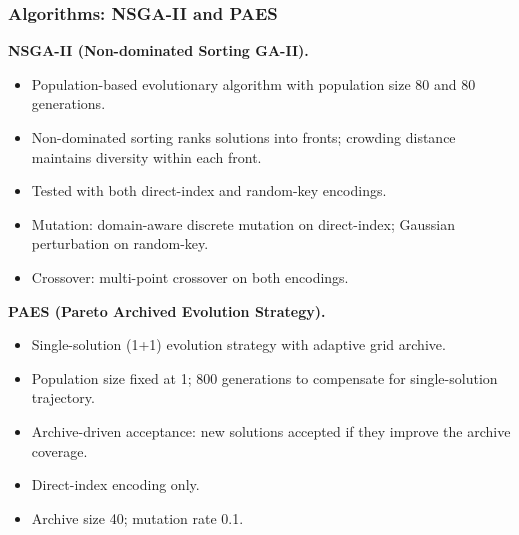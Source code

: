 \documentclass[aspectratio=169,10pt]{beamer}
\begin{document}
\begin{frame}
\frametitle{Algorithms: NSGA-II and PAES}

\textbf{NSGA-II (Non-dominated Sorting GA-II).}
\begin{itemize}
  \item Population-based evolutionary algorithm with population size 80 and 80 generations.
  \item Non-dominated sorting ranks solutions into fronts; crowding distance maintains diversity within each front.
  \item Tested with both direct-index and random-key encodings.
  \item Mutation: domain-aware discrete mutation on direct-index; Gaussian perturbation on random-key.
  \item Crossover: multi-point crossover on both encodings.
\end{itemize}

\vspace{0.3cm}

\textbf{PAES (Pareto Archived Evolution Strategy).}
\begin{itemize}
  \item Single-solution (1+1) evolution strategy with adaptive grid archive.
  \item Population size fixed at 1; 800 generations to compensate for single-solution trajectory.
  \item Archive-driven acceptance: new solutions accepted if they improve the archive coverage.
  \item Direct-index encoding only.
  \item Archive size 40; mutation rate 0.1.
\end{itemize}

\end{frame}
\end{document}
